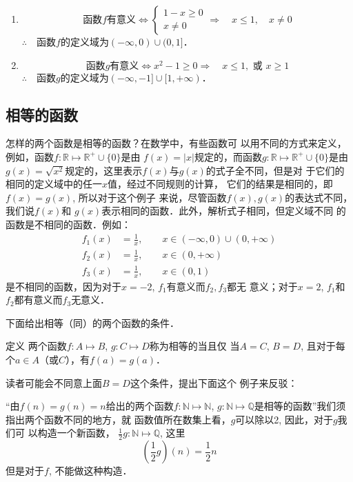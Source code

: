 \begin{solution}
    \begin{enumerate}
        \item \[\text{函数$f$有意义}\Leftrightarrow \begin{cases}
    1-x \ge 0\\
    x\ne 0
\end{cases}\Rightarrow\quad x\le 1, \quad x\ne 0\]
$\therefore\quad $函数$f$的定义域为$(-\infty,0)\cup(0,1]$．

\item \[\text{函数$g$有意义}\Leftrightarrow x^2-1\ge 0 \Rightarrow\quad x\le 1, \text{ 或 } x\ge 1\]
$\therefore\quad $函数$g$的定义域为$(-\infty,-1]\cup[1,+\infty)$．
    \end{enumerate}
\end{solution}

\subsection{相等的函数}
怎样的两个函数是相等的函数？在数学中，有些函数可
以用不同的方式来定义，例如，函数$f:\mathbb{R}\mapsto \mathbb{R}^+\cup\{0\}$是由
$f(x)=|x|$规定的，而函数$g:\mathbb{R}\mapsto \mathbb{R}^+\cup\{0\}$是由$g(x)=\sqrt{x^2}$规定的，这里表示$f(x)$与$g(x)$的式子全不同，但是对
于它们的相同的定义域中的任一$x$值，经过不同规则的计算，
它们的结果是相同的，即$f(x)=g(x)$, 所以对于这个例子
来说，尽管函数$f(x),g(x)$的表达式不同，我们说$f(x)$和
$g(x)$表示相同的函数．此外，解析式子相同，但定义域不同
的函数是不相同的函数．例如：
\[\begin{split}
    f_1(x)&=\frac{1}{x},\qquad x\in (-\infty,0)\cup(0,+\infty)\\
    f_2(x)&=\frac{1}{x},\qquad x\in (0,+\infty)\\
    f_3(x)&=\frac{1}{x},\qquad x\in (0,1)
\end{split}\]
是不相同的函数，因为对于$x=-2$, $f_1$有意义而$f_2,f_3$都无
意义；对于$x=2$, $f_1$和$f_2$都有意义而$f_3$无意义．

下面给出相等（同）的两个函数的条件．

\begin{blk}{定义}
    两个函数$f:A\mapsto B$, $g:C\mapsto D$称为相等的当且仅
    当$A=C$, $B=D$, 且对于每个$a\in  A$（或$C$），有$f(a)=g(a)$．
\end{blk}

读者可能会不同意上面$B=D$这个条件，提出下面这个
例子来反驳：

“由$f(n)=g(n)=n$给出的两个函数$f:\mathbb{N}\mapsto\mathbb{N}$, $g: \mathbb{N}\mapsto \mathbb{Q}$是相等的函数”我们须指出两个函数不同的地方，就
函数值所在数集上看，$g$可以除以2, 因此，对于$g$我们可
以构造一个新函数，
$\frac{1}{2}g:\mathbb{N}\mapsto \mathbb{Q}$, 这里
\[\left(\frac{1}{2}g\right)(n)=\frac{1}{2}n\]
但是对于$f$, 不能做这种构造．

